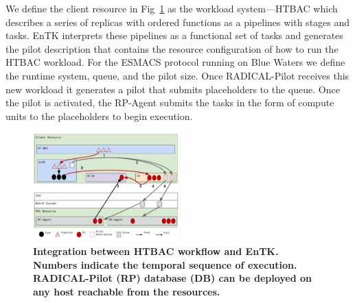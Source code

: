 We define the client resource in Fig~\ref{figure:ht-bac_rp} as the workload
system---HTBAC which describes a series of replicas with ordered functions as
a pipelines with stages and tasks. EnTK interprets these pipelines as a
functional set of tasks and generates the pilot description that contains the
resource configuration of how to run the HTBAC workload. For the ESMACS
protocol running on Blue Waters we define the runtime system, queue, and the
pilot size. Once RADICAL-Pilot receives this new workload it generates a
pilot that submits placeholders to the queue. Once the pilot is activated,
the RP-Agent submits the tasks in the form of compute units to the
placeholders to begin execution.

\begin{figure}[ht]
\centering
  \includegraphics[width=0.5\textwidth]{FIGURES/ht-bac-rp_integration.pdf}
  \caption{\bf Integration between HTBAC workflow and EnTK. Numbers indicate
  the temporal sequence of execution. RADICAL-Pilot (RP) database (DB) can be
  deployed on any host reachable from the resources.}\label{figure:ht-bac_rp}
\end{figure}


